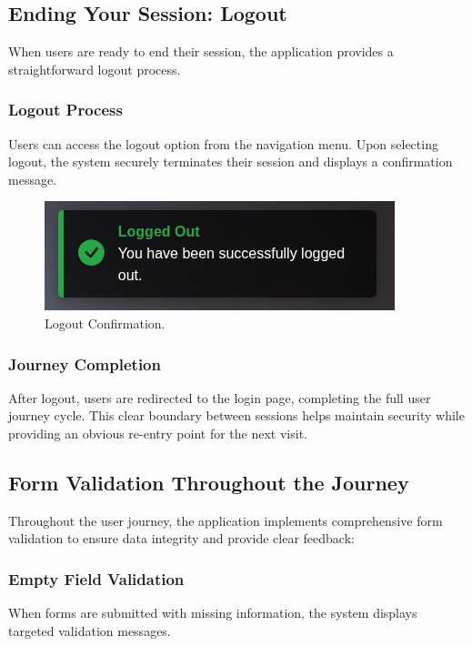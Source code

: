 \subsection{Ending Your Session: Logout}

When users are ready to end their session, the application provides a straightforward logout process.

\subsubsection{Logout Process} Users can access the logout option from the navigation menu. Upon selecting logout, the system securely terminates their session and displays a confirmation message.

\begin{figure}[H]
    \centering
    \includegraphics[width=0.65\linewidth]{Figures/images/new_images/LogoutSuccessfully.png}
    \caption{Logout Confirmation.} %
    \label{fig:logout-confirmation-journey}
\end{figure}

\subsubsection{Journey Completion} After logout, users are redirected to the login page, completing the full user journey cycle. This clear boundary between sessions helps maintain security while providing an obvious re-entry point for the next visit.

\subsection{Form Validation Throughout the Journey}

Throughout the user journey, the application implements comprehensive form validation to ensure data integrity and provide clear feedback:

\subsubsection{Empty Field Validation} When forms are submitted with missing information, the system displays targeted validation messages.

